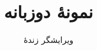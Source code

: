 \documentclass[12pt,a4paper]{article}
\title{نمونهٔ دوزبانه \lr{(Bilingual Example)}}
\author{ویرایشگر زندهٔ \lr{RTL LaTeX}}
\date{}
\begin{document}
\maketitle






\renewcommand{\refname}{\rl{\persianfont منابع}}
\begin{latin}


\end{latin}
\end{document}
